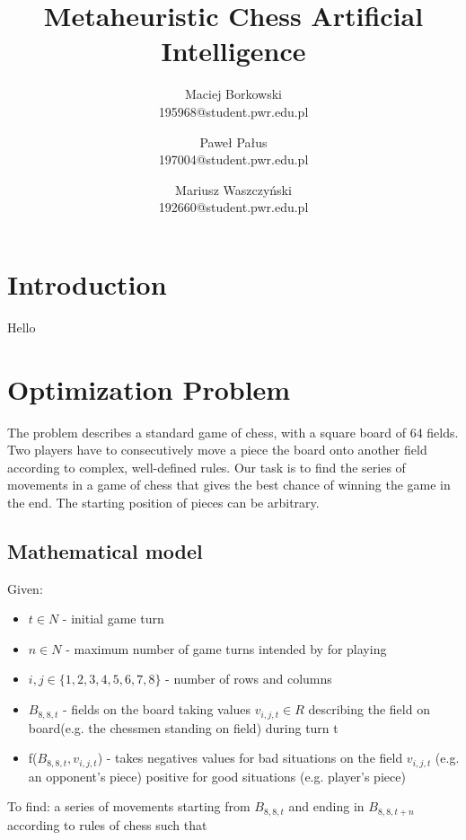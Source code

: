 \documentclass[pdftex]{article}
\date{}
\title{Metaheuristic Chess Artificial Intelligence}
\author{Maciej Borkowski\\ 195968@student.pwr.edu.pl \and Paweł Pałus\\ 197004@student.pwr.edu.pl  \and Mariusz Waszczyński\\  192660@student.pwr.edu.pl }
\begin{document}
\thispagestyle{empty}

\section{Introduction}
\label{sec:introduction}

Hello

\section{Optimization Problem}
\label{sec:problem}

The problem describes a standard game of chess, with a square board of 64 fields. Two players have to consecutively move a piece the board onto another field according to complex, well-defined rules. Our task is to find the series of movements in a game of chess that gives the best chance of winning the game in the end. The starting position of pieces can be arbitrary.

\subsection{Mathematical model}
\label{sec:model}
Given:
\begin{itemize}
 	\item $t \in N$ - initial game turn 
 	\item $n \in N$ - maximum number of game turns intended by for playing 
 	\item $i,j \in \{1,2,3,4,5,6,7,8\}$ - number of rows and columns
 	\item $B_{8,8,t}$ - fields on the board taking values $v_{i,j,t}\in R$ describing the field on board(e.g. the chessmen standing on field) during turn t
 	\item f($B_{8,8,t},v_{i,j,t}$) - takes negatives values for bad situations on the field $v_{i,j,t}$ (e.g. an opponent's piece) positive for good situations (e.g. player's piece)
\end{itemize}
To find:
\newline
a series of movements starting from $B_{8,8,t}$ and ending in $B_{8,8,t+n}$ according to rules of chess
\newline
such that
\end{document}
